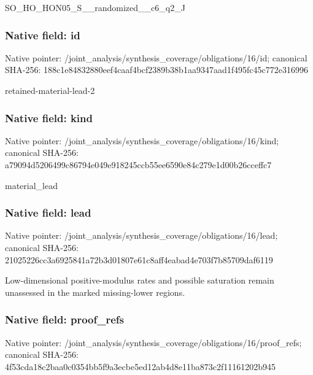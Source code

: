 \documentclass[10pt,a4paper]{article}
\begin{document}
\begingroup\raggedright\sloppy SO\_\allowbreak{}HO\_\allowbreak{}HON05\_\allowbreak{}S\_\allowbreak{}\_\allowbreak{}randomized\_\allowbreak{}\_\allowbreak{}c6\_\allowbreak{}q2\_\allowbreak{}J\par\endgroup

\subsubsection{Native field: id}
Native pointer: /joint\_\allowbreak{}analysis/synthesis\_\allowbreak{}coverage/obligations/16/id; canonical SHA-256: 188c1e84832880eef4caaf4bcf2389b38b1aa9347aad1f495fc45c772e316996

\begingroup\raggedright\sloppy retained-material-lead-2\par\endgroup

\subsubsection{Native field: kind}
Native pointer: /joint\_\allowbreak{}analysis/synthesis\_\allowbreak{}coverage/obligations/16/kind; canonical SHA-256: a79094d5206499c86794e049e918245ccb55ee6590e84c279e1d00b26cceffc7

\begingroup\raggedright\sloppy material\_\allowbreak{}lead\par\endgroup

\subsubsection{Native field: lead}
Native pointer: /joint\_\allowbreak{}analysis/synthesis\_\allowbreak{}coverage/obligations/16/lead; canonical SHA-256: 21025226cc3a6925841a72b3d01807e61c8aff4eabad4e703f7b85709daf6119

\begingroup\raggedright\sloppy Low-dimensional positive-modulus rates and possible saturation remain unassessed in the marked missing-lower regions.\par\endgroup

\subsubsection{Native field: proof\_\allowbreak{}refs}
Native pointer: /joint\_\allowbreak{}analysis/synthesis\_\allowbreak{}coverage/obligations/16/proof\_\allowbreak{}refs; canonical SHA-256: 4f53cda18c2baa0c0354bb5f9a3ecbe5ed12ab4d8e11ba873c2f11161202b945
\end{document}

